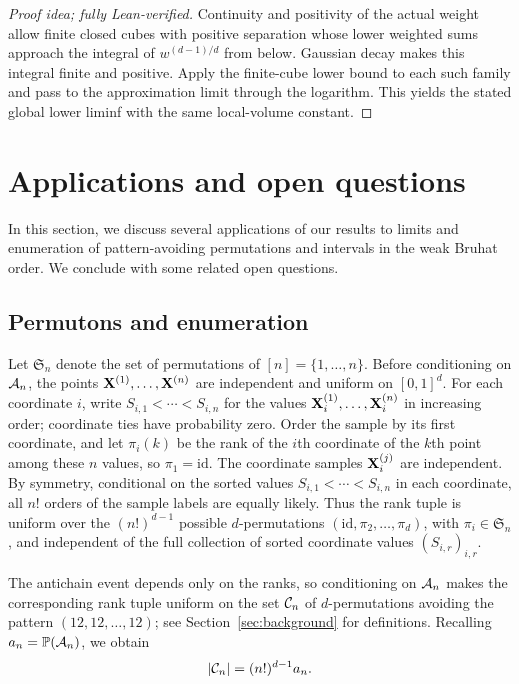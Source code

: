 \documentclass[11pt,letterpaper]{article}
\begin{document}
\begin{proof}[Proof idea; fully Lean-verified]
Continuity and positivity of the actual weight allow finite closed cubes with positive separation whose lower weighted sums approach the integral of $w^{(d-1)/d}$ from below. Gaussian decay makes this integral finite and positive. Apply the finite-cube lower bound to each such family and pass to the approximation limit through the logarithm. This yields the stated global lower liminf with the same local-volume constant.
\end{proof}


\section{Applications and open questions}\label{sec:applications}
In this section, we discuss several applications of our results to limits and enumeration of pattern-avoiding permutations and intervals in the weak Bruhat order. We conclude with some related open questions.

\subsection{Permutons and enumeration}\label{sec:ranks}


Let $\mathfrak S_n$ denote the set of permutations of $[n]=\{1,\ldots,n\}$. Before conditioning on $\mathcal A_n$, the points $\mathbf X^{(1)},\ldots,\mathbf X^{(n)}$ are independent and uniform on $[0,1]^d$. For each coordinate $i$, write $S_{i,1}<\cdots<S_{i,n}$ for the values $\mathbf X_i^{(1)},\ldots,\mathbf X_i^{(n)}$ in increasing order; coordinate ties have probability zero.
Order the sample by its first coordinate, and let $\pi_i(k)$ be the rank of the $i$th coordinate of the $k$th point among these $n$ values, so $\pi_1=\mathrm{id}$. The coordinate samples $\mathbf X_i^{(j)}$ are independent. By symmetry, conditional on the sorted values $S_{i,1}<\cdots<S_{i,n}$ in each coordinate, all $n!$ orders of the sample labels are equally likely.
Thus the rank tuple is uniform over the $(n!)^{d-1}$ possible $d$-permutations $(\mathrm{id},\pi_2,\ldots,\pi_d)$, with $\pi_i\in\mathfrak S_n$, and independent of the full collection of sorted coordinate values $(S_{i,r})_{i,r}$.

The antichain event depends only on the ranks, so conditioning on $\mathcal A_n$ makes the corresponding rank tuple uniform on the set $\mathcal C_n$ of $d$-permutations avoiding the pattern $(12,12,\ldots,12)$; see Section~\ref{sec:background} for definitions. Recalling $a_n=\mathbb P(\mathcal A_n)$, we obtain
\begin{equation}\label{eq:rank-count}
      |\mathcal C_n|=(n!)^{d-1}a_n.
\end{equation}
\end{document}
